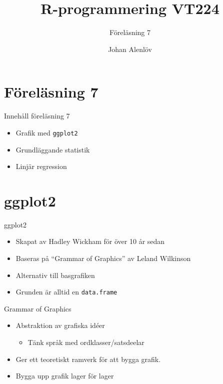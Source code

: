 \documentclass[
  11pt,
  ignorenonframetext,
  handout]{beamer}
\title{R-programmering VT224}
\subtitle{Föreläsning 7}
\author{Johan Alenlöv}
\date{}
\institute{Linköpings Universitet}
\providecommand{\tightlist}{%
  \setlength{\itemsep}{0pt}\setlength{\parskip}{0pt}}
\begin{document}
\frame{\titlepage}

\section{Föreläsning 7}\label{fuxf6reluxe4sning-7}

\begin{frame}{Innehåll föreläsning 7}
\label{innehuxe5ll-fuxf6reluxe4sning-7}
\begin{itemize}
\tightlist
\item
  Grafik med \texttt{ggplot2}
\item
  Grundläggande statistik
\item
  Linjär regression
\end{itemize}
\end{frame}

\section{ggplot2}\label{ggplot2}

\begin{frame}{ggplot2}
\label{ggplot2-1}
\begin{itemize}
\tightlist
\item
  Skapat av Hadley Wickham för över 10 år sedan
\item
  Baseras på ``Grammar of Graphics'' av Leland Wilkinson
\item
  Alternativ till basgrafiken
\item
  Grunden är alltid en \texttt{data.frame}
\end{itemize}
\end{frame}

\begin{frame}{Grammar of Graphics}
\label{grammar-of-graphics}
\begin{itemize}
\tightlist
\item
  Abstraktion av grafiska idéer

  \begin{itemize}
  \tightlist
  \item
    Tänk språk med ordklasser/satsdeelar
  \end{itemize}
\item
  Ger ett teoretiskt ramverk för att bygga grafik.
\item
  Bygga upp grafik lager för lager
\end{itemize}
\end{frame}
\end{document}
